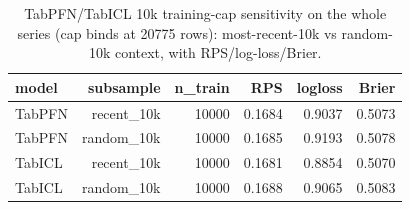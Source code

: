 \begin{table}[t]
  \centering
  \caption{TabPFN/TabICL 10k training-cap sensitivity on the whole series (cap binds at 20775 rows): most-recent-10k vs random-10k context, with RPS/log-loss/Brier.}
  \label{tab:rev_tabpfn_cap}
  \begin{tabular}{lrrrrr}
  \toprule
  model & subsample & n\_train & RPS & logloss & Brier \\
  \midrule
  TabPFN & recent\_10k & 10000 & 0.1684 & 0.9037 & 0.5073 \\
  TabPFN & random\_10k & 10000 & 0.1685 & 0.9193 & 0.5078 \\
  TabICL & recent\_10k & 10000 & 0.1681 & 0.8854 & 0.5070 \\
  TabICL & random\_10k & 10000 & 0.1688 & 0.9065 & 0.5083 \\
  \bottomrule
  \end{tabular}
\end{table}
